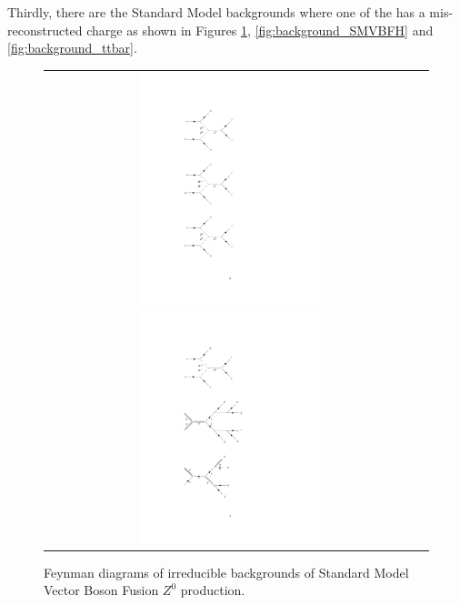 Thirdly, there are the Standard Model backgrounds where one of the \hadtau has a mis-reconstructed charge as shown in Figures \ref{fig:background_SMVBFZ0}, \ref{fig:background_SMVBFH} and \ref{fig:background_ttbar}. 

\begin{figure}[tbh!]
	\centering
	\begin{tabular}{cc}
		\includegraphics[width=0.50\textwidth]{diagrams/pics/background_SMVBFZ0Z0.pdf}
		\includegraphics[width=0.50\textwidth]{diagrams/pics/background_SMVBFZ0W.pdf} 		
	\end{tabular}
	\caption{Feynman diagrams of irreducible backgrounds of Standard Model Vector Boson Fusion $Z^{0}$ production. }
	\label{fig:background_SMVBFZ0}
\end{figure}

